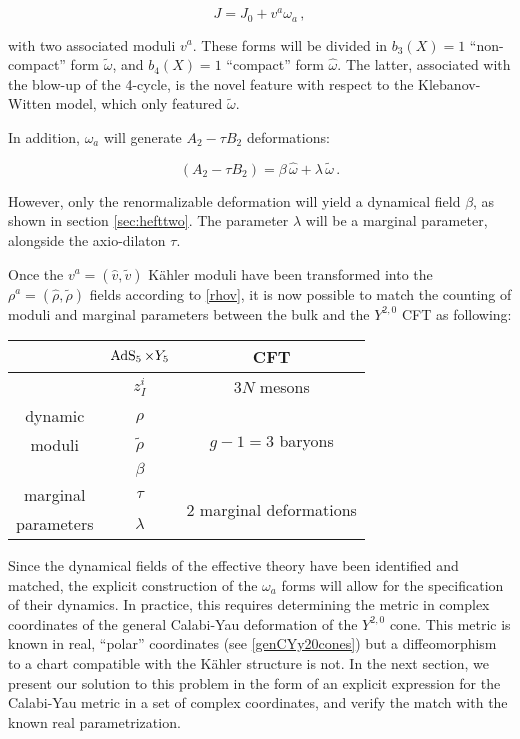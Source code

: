 \begin{equation}
	J = J_0 + v^a \omega_a\,,
	\label{}
\end{equation}

with two associated moduli $v^a$. These forms will be divided in $b_3(X) = 1$ ``non-compact'' form $\tilde\omega$, and $b_4(X) = 1$ ``compact'' form $\hat \omega$. The latter, associated with the blow-up of the 4-cycle, is the novel feature with respect to the Klebanov-Witten model, which only featured $\tilde\omega$.

In addition, $\omega_a$ will generate $A_2 - \tau B_2$ deformations:

\begin{equation}
	(A_2 - \tau B_2) = \beta \, \hat \omega + \lambda \, \tilde \omega\,.
	\label{}
\end{equation}

However, only the renormalizable deformation will yield a dynamical field $\beta$, as shown in section \ref{sec:hefttwo}. The parameter $\lambda$ will be a marginal parameter, alongside the axio-dilaton $\tau$.

Once the $v^a = (\hat v, \tilde v)$ K\"ahler moduli have been transformed into the $\rho^a = (\hat \rho, \tilde \rho)$ fields according to \eqref{rhov}, it is now possible to match the counting of moduli and marginal parameters between the bulk and the $Y^{2,0}$ CFT as following:

\begin{center}
\begin{tabular}{ccc}
	 		& $\operatorname{AdS}_{5} \times Y_5$ & CFT \\ \midrule \midrule
			& $ z_I^i$ & $3N$ mesons\\ \cmidrule{2-3} 
dynamic 		& $\hat \rho$ & \multirow{3}{*}{$g-1 = 3$ baryons} \\
moduli			& $\tilde \rho$ & \\
			& $ \beta$ & \\ \midrule
marginal	& $\tau$ 	&  \multirow{2}{*}{$2$ marginal deformations}	\\
parameters			& $\lambda$ &	
\end{tabular}
\end{center}

Since the dynamical fields of the effective theory have been identified and matched, the explicit construction of the $\omega_a$ forms will allow for the specification of their dynamics. In practice, this requires determining the metric in complex coordinates of the general Calabi-Yau deformation of the $Y^{2,0}$ cone. This metric is known in real, ``polar'' coordinates (see \eqref{genCYy20cones}) but a diffeomorphism to a chart compatible with the K\"ahler structure is not. In the next section, we present our solution to this problem in the form of an explicit expression for the Calabi-Yau metric in a set of complex coordinates, and verify the match with the known real parametrization.


